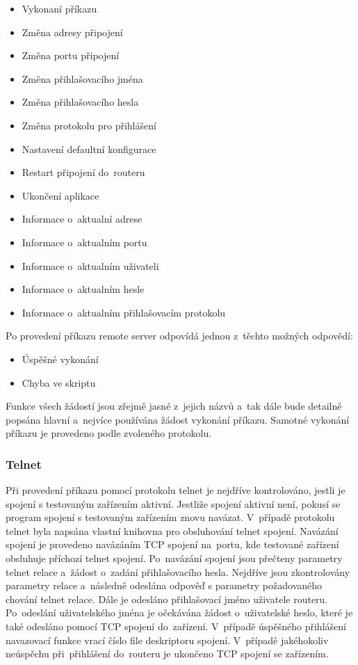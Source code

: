 \begin{itemize}
  \item Vykonaní příkazu
  \item Změna adresy připojení
  \item Změna portu připojení
  \item Změna přihlašovacího jména
  \item Změna přihlašovacího hesla
  \item Změna protokolu pro přihlášení
  \item Nastavení defaultní konfigurace
  \item Restart připojení do~routeru
  \item Ukončení aplikace
  \item Informace o~aktualní adrese
  \item Informace o~aktualním portu
  \item Informace o~aktualním uživateli
  \item Informace o~aktualním hesle
  \item Informace o~aktualním přihlašovacím protokolu
\end{itemize}

Po provedení příkazu remote server odpovídá jednou z~těchto možných odpovědí:

\begin{itemize}
  \item Úspěšné vykonání
  \item Chyba ve skriptu
\end{itemize}

Funkce všech žádostí jsou zřejmě jasné z~jejich názvů a~tak dále bude detailně popsána hlavní a~nejvíce používána žádost vykonání příkazu. Samotné vykonání příkazu je provedeno podle zvoleného protokolu.

\subsubsection{Telnet}
Při provedení příkazu pomocí protokolu telnet je nejdříve kontrolováno, jestli je spojení s testovaným zařízením aktivní. Jestliže spojení aktivní není, pokusí se program spojení s testovaným zařízením znovu navázat. V~případě protokolu telnet byla napsána vlastní knihovna pro obsluhování telnet spojení. Navázání spojení je provedeno navázáním TCP spojení na~portu, kde testované zařízení obsluhuje příchozí telnet spojení. Po~navázání spojení jsou přečteny parametry telnet relace a~žádost o~zadání přihlašovacího hesla. Nejdříve jsou zkontrolovány parametry relace a~následně odeslána odpověď s parametry požadovaného chování telnet relace. Dále je odesláno přihlašovací jméno uživatele routeru. Po~odeslání uživatelského jména je očekávána žádost o~uživatelské heslo, které je také odesláno pomocí TCP spojení do~zařízení. V~případě úspěšného přihlášení navazovací funkce vrací číslo file deskriptoru spojení. V~případě jakéhokoliv neúspěchu při~přihlášení do~routeru je ukončeno TCP spojení se zařízením.

